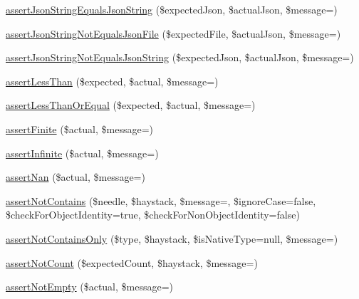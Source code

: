 \begin{DoxyCompactItemize}
\item 
\mbox{\hyperlink{_functions_8php_a67e4f4f2b75482365c2ad4886b2bfd03}{assert\+Json\+String\+Equals\+Json\+String}} (\$expected\+Json, \$actual\+Json, \$message=\textquotesingle{}\textquotesingle{})
\item 
\mbox{\hyperlink{_functions_8php_a4a099320cda71c8c309fc7e5c1e0bf58}{assert\+Json\+String\+Not\+Equals\+Json\+File}} (\$expected\+File, \$actual\+Json, \$message=\textquotesingle{}\textquotesingle{})
\item 
\mbox{\hyperlink{_functions_8php_ad0f8a5657ef0a5dad50004376e149fa6}{assert\+Json\+String\+Not\+Equals\+Json\+String}} (\$expected\+Json, \$actual\+Json, \$message=\textquotesingle{}\textquotesingle{})
\item 
\mbox{\hyperlink{_functions_8php_aeff8dc4011b81e0900e3da4ad49cbc4f}{assert\+Less\+Than}} (\$expected, \$actual, \$message=\textquotesingle{}\textquotesingle{})
\item 
\mbox{\hyperlink{_functions_8php_a903e9496fc283879b3cbbbb5a356fbcd}{assert\+Less\+Than\+Or\+Equal}} (\$expected, \$actual, \$message=\textquotesingle{}\textquotesingle{})
\item 
\mbox{\hyperlink{_functions_8php_a8917a9921e971c8cde61c1845d16e326}{assert\+Finite}} (\$actual, \$message=\textquotesingle{}\textquotesingle{})
\item 
\mbox{\hyperlink{_functions_8php_a3c819f738875d9f28abb94828d985edd}{assert\+Infinite}} (\$actual, \$message=\textquotesingle{}\textquotesingle{})
\item 
\mbox{\hyperlink{_functions_8php_a6886780078734312724429bd06e792ed}{assert\+Nan}} (\$actual, \$message=\textquotesingle{}\textquotesingle{})
\item 
\mbox{\hyperlink{_functions_8php_a6a61b83692ab545b4aac71ae27437f72}{assert\+Not\+Contains}} (\$needle, \$haystack, \$message=\textquotesingle{}\textquotesingle{}, \$ignore\+Case=false, \$check\+For\+Object\+Identity=true, \$check\+For\+Non\+Object\+Identity=false)
\item 
\mbox{\hyperlink{_functions_8php_a70e611d22f646d429e16d777d6557e00}{assert\+Not\+Contains\+Only}} (\$type, \$haystack, \$is\+Native\+Type=null, \$message=\textquotesingle{}\textquotesingle{})
\item 
\mbox{\hyperlink{_functions_8php_a53715028c9f2e944e5c72885caf6d577}{assert\+Not\+Count}} (\$expected\+Count, \$haystack, \$message=\textquotesingle{}\textquotesingle{})
\item 
\mbox{\hyperlink{_functions_8php_a841ddb22ebbe78fd46007983051f7275}{assert\+Not\+Empty}} (\$actual, \$message=\textquotesingle{}\textquotesingle{})

\end{DoxyCompactItemize}
